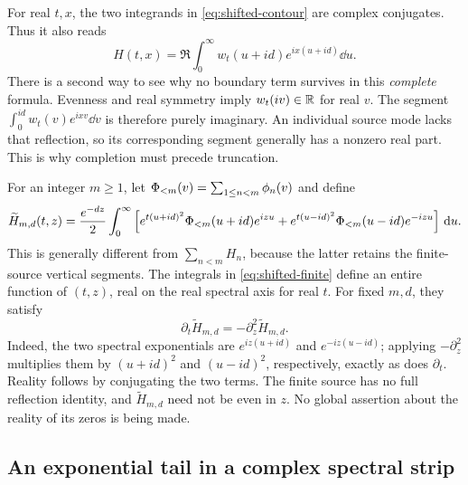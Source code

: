 For real $t,x$, the two integrands in \eqref{eq:shifted-contour} are
complex conjugates. Thus it also reads
\[
 H(t,x)=\Re\int_0^\infty w_t(u+id)e^{ix(u+id)}\dd u.
\]
There is a second way to see why no boundary term survives in this
\emph{complete} formula. Evenness and real symmetry imply
$w_t(iv)\in\mathbb R$ for real $v$. The segment
$\int_0^{id}w_t(v)e^{ixv}\dd v$ is therefore purely imaginary. An individual
source mode lacks that reflection, so its corresponding segment generally
has a nonzero real part. This is why completion must precede truncation.

For an integer $m\ge1$, let
$\Phi_{<m}(v)=\sum_{1\le n<m}\phi_n(v)$ and define
\begin{equation}\label{eq:shifted-finite}
 \widetilde H_{m,d}(t,z)=\frac{e^{-dz}}2\int_0^\infty
 \left[e^{t(u+id)^2}\Phi_{<m}(u+id)e^{izu}
       +e^{t(u-id)^2}\Phi_{<m}(u-id)e^{-izu}\right]\,\mathrm d u.
\end{equation}
This is generally different from $\sum_{n<m}H_n$, because the latter
retains the finite-source vertical segments. The integrals in
\eqref{eq:shifted-finite} define an entire function of $(t,z)$, real on
the real spectral axis for real $t$. For fixed $m,d$, they satisfy
\begin{equation}\label{eq:shifted-heat}
 \partial_t\widetilde H_{m,d}=-\partial_z^2\widetilde H_{m,d}.
\end{equation}
Indeed, the two spectral exponentials are
$e^{iz(u+id)}$ and $e^{-iz(u-id)}$; applying $-\partial_z^2$ multiplies
them by $(u+id)^2$ and $(u-id)^2$, respectively, exactly as does
$\partial_t$. Reality follows by conjugating the two terms.
The finite source has no full reflection identity, and
$\widetilde H_{m,d}$ need not be even in $z$. No global assertion about
the reality of its zeros is being made.

\subsection{An exponential tail in a complex spectral strip}

